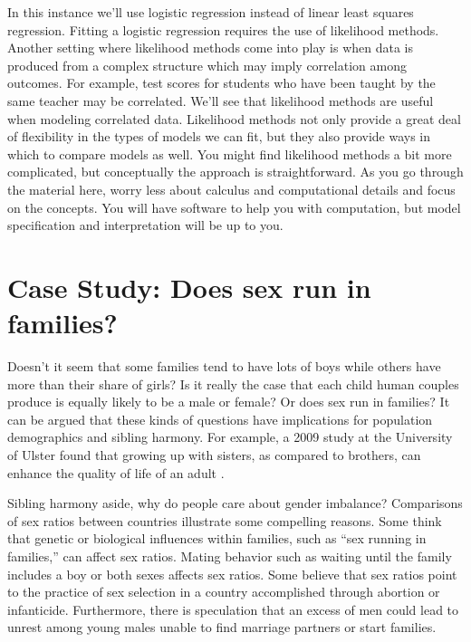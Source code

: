 \documentclass[
]{krantz}
\begin{document}
In this instance we'll use logistic regression instead of linear least squares regression. Fitting a logistic regression requires the use of likelihood methods. Another setting where likelihood methods come into play is when data is produced from a complex structure which may imply correlation among outcomes. For example, test scores for students who have been taught by the same teacher may be correlated. We'll see that likelihood methods are useful when modeling correlated data. Likelihood methods not only provide a great deal of flexibility in the types of models we can fit, but they also provide ways in which to compare models as well. You might find likelihood methods a bit more complicated, but conceptually the approach is straightforward. As you go through the material here, worry less about calculus and computational details and focus on the concepts. You will have software to help you with computation, but model specification and interpretation will be up to you.

\hypertarget{case-study-does-sex-run-in-families}{%
\section{Case Study: Does sex run in families?}\label{case-study-does-sex-run-in-families}}

Doesn't it seem that some families tend to have lots of boys while others have more than their share of girls? Is it really the case that each child human couples produce is equally likely to be a male or female? Or does sex run in families? It can be argued that these kinds of questions have implications for population demographics and sibling harmony. For example, a 2009 study at the University of Ulster found that growing up with sisters, as compared to brothers, can enhance the quality of life of an adult \citep{BBCNEWS1995}.

Sibling harmony aside, why do people care about gender imbalance? Comparisons of sex ratios between countries illustrate some compelling reasons. Some think that genetic or biological influences within families, such as ``sex running in families,'' can affect sex ratios. Mating behavior such as waiting until the family includes a boy or both sexes affects sex ratios. Some believe that sex ratios point to the practice of sex selection in a country accomplished through abortion or infanticide. Furthermore, there is speculation that an excess of men could lead to unrest among young males unable to find marriage partners or start families.
\end{document}
